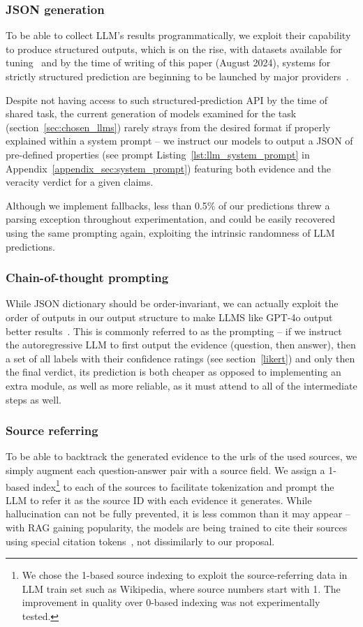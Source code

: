 \subsubsection{JSON generation}

To be able to collect LLM's results programmatically, we exploit their capability to produce structured outputs, which is on {the} rise, with datasets available for tuning~\cite{tang2024strucbenchlargelanguagemodels} and by the time of writing of this paper (August 2024), systems for strictly structured prediction are beginning to be launched by major providers~\cite{json}.

Despite not having access to such structured-prediction API by the time of \averitec{} shared task, the current generation of models examined for the task (section~\ref{sec:chosen_llms}) rarely strays from the desired format if properly explained within a system prompt -- we instruct our models to output a JSON of pre-defined properties (see prompt Listing~\ref{lst:llm_system_prompt} {in Appendix~\ref{appendix_sec:system_prompt}}) featuring both evidence and the veracity verdict for a given claims.

Although we implement fallbacks, less than 0.5\% of our predictions {threw} a parsing exception throughout experimentation, and could be easily recovered using the same prompting again, exploiting the intrinsic randomness of LLM predictions.

\subsubsection{Chain-of-thought prompting}
While JSON dictionary should be order-invariant, we can actually exploit the order of outputs in our output structure to make LLMS like GPT-4o output better results~\cite{cot}.
This is commonly referred to as the  prompting -- if we instruct the autoregressive LLM to first output the evidence (question, then answer), then a set of all labels with their confidence ratings (see section~\ref{likert}) and only then the final verdict, its prediction is both cheaper as opposed to implementing an extra module, as well as more reliable, as it must attend to all of the intermediate steps as well.

\subsubsection{Source referring}
To be able to backtrack the generated evidence to the urls of the used sources, we simply augment each question-answer pair with a source field.
We assign a 1-based index\footnote{{We chose the 1-based source indexing to exploit the source-referring data in LLM train set such as Wikipedia, where source numbers start with 1. The improvement in quality over 0-based indexing was not experimentally tested.}}  to each of the sources to facilitate tokenization and prompt the LLM to refer it as the source ID with each evidence it generates.
While hallucination can not be fully prevented, it is less common than it may appear -- with RAG gaining popularity, the models are being trained to cite their sources using special citation tokens~\cite{menick2022teachinglanguagemodelssupport}, not dissimilarly to our proposal.

